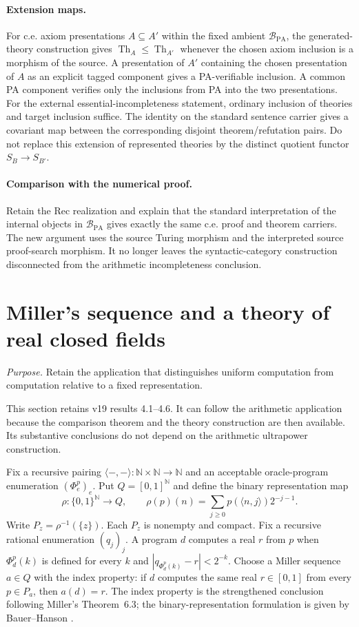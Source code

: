 \documentclass[11pt]{article}
\theoremstyle{definition}\newtheorem{definition}[theorem]{Definition}
\newcommand{\PA}{\mathrm{PA}}
\newcommand{\N}{\mathbb N}
\newcommand{\Th}{\operatorname{Th}}
\newcommand{\B}{\mathcal B}
\newcommand{\purpose}[1]{\noindent\textit{Purpose.} #1\par\medskip}
\begin{document}
\paragraph{Extension maps.}
For c.e. axiom presentations $A\subseteq A'$ within the fixed
ambient $\B_{\PA}$, the generated-theory construction gives
$\Th_A\le\Th_{A'}$ whenever the chosen axiom inclusion is a
morphism of the source. A presentation of $A'$ containing the chosen
presentation of $A$ as an explicit tagged component gives a
PA-verifiable inclusion. A common PA component verifies only the
inclusions from PA into the two presentations. For the
external essential-incompleteness statement, ordinary inclusion of
theories and target inclusion suffice. The identity on the standard sentence
carrier gives a covariant map between the corresponding disjoint
theorem/refutation pairs. Do not replace this extension of represented
theories by the distinct quotient functor $S_B\to S_{B'}$.

\paragraph{Comparison with the numerical proof.}
Retain the $\mathrm{Rec}$ realization and explain that the standard
interpretation of the internal objects in $\B_{\PA}$ gives exactly
the same c.e. proof and theorem carriers. The new argument uses the
source Turing morphism and the interpreted source proof-search
morphism. It no longer leaves the syntactic-category construction
disconnected from the arithmetic incompleteness conclusion.

\section{Miller's sequence and a theory of real closed fields}
\purpose{Retain the application that distinguishes uniform computation from computation relative to a fixed representation.}
This section retains v19 results 4.1--4.6. It can follow the
arithmetic application because the comparison theorem and the theory
construction are then available. Its substantive conclusions do not
depend on the arithmetic ultrapower construction.

Fix a recursive pairing $\langle-,-\rangle:\N\times\N\to\N$
and an acceptable oracle-program enumeration $(\Phi_e^p)_e$.
Put $Q=[0,1]^{\N}$ and define the binary representation map
\[
 \rho:\{0,1\}^{\N}\to Q,\qquad
 \rho(p)(n)=\sum_{j\ge0}p(\langle n,j\rangle)2^{-j-1}.
\]
Write $P_z=\rho^{-1}(\{z\})$. Each $P_z$ is nonempty and compact.
Fix a recursive rational enumeration $(q_j)_j$. A program $d$
computes a real $r$ from $p$ when $\Phi_d^p(k)$ is defined for
every $k$ and $|q_{\Phi_d^p(k)}-r|<2^{-k}$. Choose a Miller
sequence $a\in Q$ with the index property: if $d$ computes the
same real $r\in[0,1]$ from every $p\in P_a$, then $a(d)=r$.
The index property is the strengthened conclusion following
Miller's Theorem~6.3; the binary-representation formulation is
given by Bauer--Hanson
\cite[Theorem~6.3 and following paragraph]{Miller}
\cite[\S2.1 and Theorem~2.2]{BauerHanson}.
\end{document}
